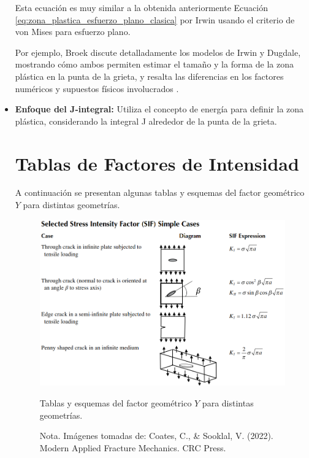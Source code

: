 \documentclass[12pt,letterpaper]{article}
\begin{document}
\begin{itemize}
    Esta ecuación es muy similar a la obtenida anteriormente Ecuación \eqref{eq:zona_plastica_esfuerzo_plano_clasica} por Irwin usando el criterio de von Mises para esfuerzo plano.

    Por ejemplo, Broek discute detalladamente los modelos de Irwin y Dugdale, mostrando cómo ambos permiten estimar el tamaño y la forma de la zona plástica en la punta de la grieta, y resalta las diferencias en los factores numéricos y supuestos físicos involucrados \cite{Broek1982}.
    \item \textbf{Enfoque del J-integral:} Utiliza el concepto de energía para definir la zona plástica, considerando la integral J alrededor de la punta de la grieta.

\section{Tablas de Factores de Intensidad}

A continuación se presentan algunas tablas y esquemas del factor geométrico $Y$ para distintas geometrías.

\begin{figure}[H]
    \centering
    \includegraphics[width=0.65\linewidth]{cc.png} %
    \caption{Tablas y esquemas del factor geométrico $Y$ para distintas geometrías.}
    \label{fig:factor_intensidad_Y}
    \caption*{Nota. Imágenes tomadas de: Coates, C., \& Sooklal, V. (2022). Modern Applied Fracture Mechanics. CRC Press.}
    \end{figure}


\end{itemize}
\end{document}
